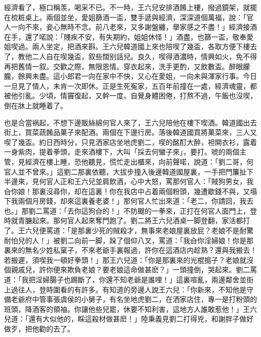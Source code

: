 經濟看了，極口稱羡，喝采不已。不一時，王六兒安排酒餚上樓，撥過鏡架，就擺在梳粧桌上。兩個並坐，愛姐篩酒一盃，雙手遞與經濟，深深道個萬福，說：「官人一向不來，妾心無時不念。前八老來，又多謝盤纏，擧家感之不盡！」經濟接酒在手，還了喏說：「賤疾不安，有失期約，姐姐休怪！」酒盡，也篩一盃，敬奉愛姐喫過。兩人坐定，把酒來斟。王六兒韓道國上來也陪喫了幾盃，各取方便下樓去了，教他二人自在喫幾盃，叙些闊别話兒。良久，喫得酒濃時，情興如火，免不得再把舊情一叙。交歡之際，無限恩情。穿衣起來，洗手更酌，又飲數盃。醉眼朦朧，餘興未盡。這小郎君一向在家中不快，又心在愛姐，一向未與渾家行事。今日一旦見了情人，未肯一次即休。正是生死寃家，五百年前撞在一處，經濟魂靈，都被他引亂。少頃，情竇復起，又幹一度。自覺身體困倦，打熬不過，午飯也沒喫，倒在牀上就睡着了。

也是合當祸起，不想下邊販絲綿何官人來了，王六兒陪他在樓下喫酒。韓道國出去街上，買菜蔬餚品菓子來配酒。兩個在下邊行房。落後韓道國買將菓菜來，三人又喫了幾盃。約日西時分，只見洒家店坐地虎劉二，喫的酩酊大醉，袒開衣衫，露着一身紫肉，提着拳頭，走來酒樓下，大叫「採去何蠻子來」，要打。唬的兩個主管，見經濟在樓上睡，恐他聽見，慌忙走出櫃來，向前聲喏，說道：「劉二哥，何官人並不曾來。」這劉二那裏依聽，大拔步撞入後邊韓道國屋裏，一手把門簾扯下半邊來，見何官人正和王六兒並肩飲酒，心中大怒，罵那何官人：「賊狗男女，我㒲你娘！那裏沒尋你，却在這裏！你在我店中占着兩個粉頭，幾遭歇錢不與，又塌下我兩個月房錢，却來這裏養老婆！」那何官人忙出來道：「老二，你請回，我去也。」那劉二罵道：「去你這狗㒲的！」不防颼的一拳來，正打在何官人面門上，登時就青膅起來。那何官人起來奪門跑了。劉二將王六兒酒桌一脚登翻，家活都打了。王六兒便罵道：「是那裏少死的賊殺才，無事來老娘屋裏放屁？老娘不是耐驚耐怕兒的人！」被劉二向前一脚，跺了個仰八叉，罵道：「我㒲你淫婦娘！你是那裏來的無名少姓私窠子，不來老爺手裏報過，許你在這酒店内趁熟？還與我搬去！若搬遲，須喫我一頓好拳頭！」那王六兒道：「你是那裏來的光棍搗子？老娘就沒個親戚兒，許你便來欺負老娘？要老娘這命做甚麽？」一頭撞倒，哭起來。劉二罵道：「我把淫婦腸子也踢斷了，你還不知老爺是誰哩！」這裏喧亂，兩邊鄰舍並街上過往人，登時圍看的有許多。有知道的旁邊人說王六兒：「你新來，不知他是守備老爺府中管事張虞侯的小舅子，有名坐地虎劉二，在洒家店住，專一是打粉頭的班頭，降酒客的領袖。你讓他些兒罷，休要不知利害，這地方人誰敢惹他！」王六兒道：「還有大似他的，睬這殺材做甚麽！」陸秉義見劉二打得兇，和謝胖子做好做歹，把他勸的去了。

